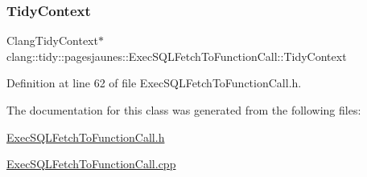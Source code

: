\subsubsection{\texorpdfstring{Tidy\+Context}{TidyContext}}
{\footnotesize\ttfamily Clang\+Tidy\+Context$\ast$ clang\+::tidy\+::pagesjaunes\+::\+Exec\+S\+Q\+L\+Fetch\+To\+Function\+Call\+::\+Tidy\+Context}



Definition at line 62 of file Exec\+S\+Q\+L\+Fetch\+To\+Function\+Call.\+h.



The documentation for this class was generated from the following files\+:\begin{DoxyCompactItemize}
\item 
\hyperlink{_exec_s_q_l_fetch_to_function_call_8h}{Exec\+S\+Q\+L\+Fetch\+To\+Function\+Call.\+h}\item 
\hyperlink{_exec_s_q_l_fetch_to_function_call_8cpp}{Exec\+S\+Q\+L\+Fetch\+To\+Function\+Call.\+cpp}\end{DoxyCompactItemize}
